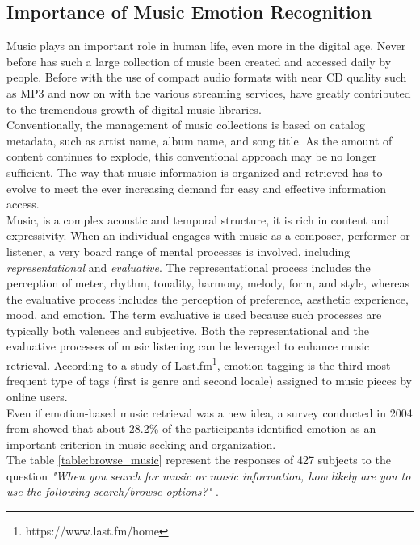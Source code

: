 \subsection{Importance of Music Emotion Recognition}
Music plays an important role in human life, even more in the digital age. Never before has such a large collection of music been created and accessed daily by people. Before with the use of compact audio formats with near CD quality such as MP3 and now on with the various streaming services, have greatly contributed to the tremendous growth of digital music libraries.
\\ \indent
Conventionally, the management of music collections is based on catalog metadata, such as artist name, album name, and song title. As the amount of content continues to explode, this conventional approach may be no longer sufficient. The way that music information is organized and retrieved has to evolve to meet the ever increasing demand for easy and effective information access.
\\ \indent
Music, is a complex acoustic and temporal structure, it is rich in content and expressivity. When an individual engages with music as a composer, performer or listener, a very board range of mental processes is involved, including \textit{representational} and \textit{evaluative}. The representational process includes the perception of meter, rhythm, tonality, harmony, melody, form, and style, whereas the evaluative process includes the perception of preference, aesthetic experience, mood, and emotion. The term evaluative is used because such processes are typically both valences and subjective. Both the representational and the evaluative processes of music listening can be leveraged to enhance music retrieval.
According to a study of \href{https://www.last.fm/home}{Last.fm}\footnote{https://www.last.fm/home}, emotion tagging is the third most frequent type of tags (first is genre and second locale) assigned to music pieces by online users.
\\ Even if emotion-based music retrieval was a new idea, a survey conducted in 2004 from \cite{lee2004survey} showed that about 28.2\% of the participants identified emotion as an important criterion in music seeking and organization.
\\ The table \ref{table:browse_music} represent the responses of 427 subjects to the question \textit{"When you search for music or music information, how likely are you to use the following search/browse options?"} \cite{lee2004survey}.
